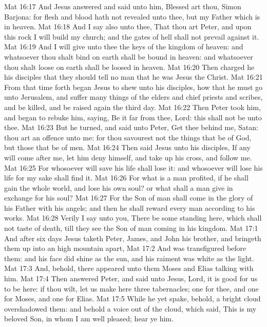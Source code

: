 \vs Mat 16:17 And Jesus answered and said unto him, Blessed art thou, Simon Barjona: for flesh and blood hath not revealed  unto thee, but my Father which is in heaven.
\vs Mat 16:18 And I say also unto thee, That thou art Peter, and upon this rock I will build my church; and the gates of hell shall not prevail against it.
\vs Mat 16:19 And I will give unto thee the keys of the kingdom of heaven: and whatsoever thou shalt bind on earth shall be bound in heaven: and whatsoever thou shalt loose on earth shall be loosed in heaven.
\vs Mat 16:20 Then charged he his disciples that they should tell no man that he was Jesus the Christ.
\vs Mat 16:21 From that time forth began Jesus to shew unto his disciples, how that he must go unto Jerusalem, and suffer many things of the elders and chief priests and scribes, and be killed, and be raised again the third day.
\vs Mat 16:22 Then Peter took him, and began to rebuke him, saying, Be it far from thee, Lord: this shall not be unto thee.
\vs Mat 16:23 But he turned, and said unto Peter, Get thee behind me, Satan: thou art an offence unto me: for thou savourest not the things that be of God, but those that be of men.
\vs Mat 16:24 Then said Jesus unto his disciples, If any  will come after me, let him deny himself, and take up his cross, and follow me.
\vs Mat 16:25 For whosoever will save his life shall lose it: and whosoever will lose his life for my sake shall find it.
\vs Mat 16:26 For what is a man profited, if he shall gain the whole world, and lose his own soul? or what shall a man give in exchange for his soul?
\vs Mat 16:27 For the Son of man shall come in the glory of his Father with his angels; and then he shall reward every man according to his works.
\vs Mat 16:28 Verily I say unto you, There be some standing here, which shall not taste of death, till they see the Son of man coming in his kingdom.
\vs Mat 17:1 And after six days Jesus taketh Peter, James, and John his brother, and bringeth them up into an high mountain apart,
\vs Mat 17:2 And was transfigured before them: and his face did shine as the sun, and his raiment was white as the light.
\vs Mat 17:3 And, behold, there appeared unto them Moses and Elias talking with him.
\vs Mat 17:4 Then answered Peter, and said unto Jesus, Lord, it is good for us to be here: if thou wilt, let us make here three tabernacles; one for thee, and one for Moses, and one for Elias.
\vs Mat 17:5 While he yet spake, behold, a bright cloud overshadowed them: and behold a voice out of the cloud, which said, This is my beloved Son, in whom I am well pleased; hear ye him.
